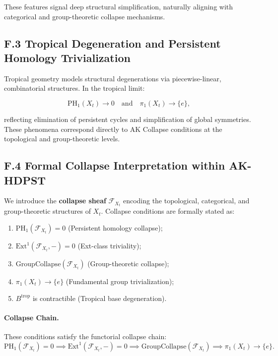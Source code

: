 \documentclass[11pt]{article}
\begin{document}
These features signal deep structural simplification, naturally aligning with categorical and group-theoretic collapse mechanisms.

\subsection*{F.3 Tropical Degeneration and Persistent Homology Trivialization}

Tropical geometry models structural degenerations via piecewise-linear, combinatorial structures. In the tropical limit:

\[
\mathrm{PH}_1(X_t) \to 0 \quad \text{and} \quad \pi_1(X_t) \longrightarrow \{ e \},
\]

reflecting elimination of persistent cycles and simplification of global symmetries. These phenomena correspond directly to AK Collapse conditions at the topological and group-theoretic levels.

\subsection*{F.4 Formal Collapse Interpretation within AK-HDPST}

We introduce the \textbf{collapse sheaf} $\mathcal{F}_{X_t}$ encoding the topological, categorical, and group-theoretic structures of $X_t$. Collapse conditions are formally stated as:

\begin{enumerate}
    \item $\mathrm{PH}_1(\mathcal{F}_{X_t}) = 0$ \quad (Persistent homology collapse);
    \item $\mathrm{Ext}^1(\mathcal{F}_{X_t}, -) = 0$ \quad (Ext-class triviality);
    \item $\mathrm{GroupCollapse}(\mathcal{F}_{X_t})$ \quad (Group-theoretic collapse);
    \item $\pi_1(X_t) \longrightarrow \{ e \}$ \quad (Fundamental group trivialization);
    \item $B^{\mathrm{trop}}$ is contractible \quad (Tropical base degeneration).
\end{enumerate}

\paragraph{Collapse Chain.}  
These conditions satisfy the functorial collapse chain:
\[
\mathrm{PH}_1(\mathcal{F}_{X_t}) = 0 
\implies \mathrm{Ext}^1(\mathcal{F}_{X_t}, -) = 0 
\implies \mathrm{GroupCollapse}(\mathcal{F}_{X_t}) 
\implies \pi_1(X_t) \longrightarrow \{ e \}.
\]
\end{document}
